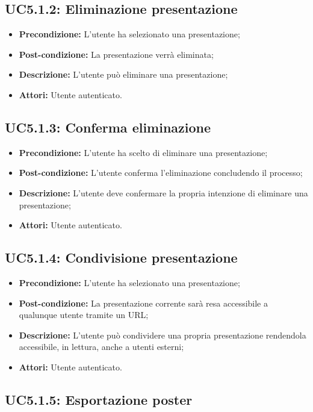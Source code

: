 \subsection{ UC5.1.2: Eliminazione presentazione}

\begin{itemize}
	\item \textbf{Precondizione:} L'utente ha selezionato una presentazione;
	\item \textbf{Post-condizione:} La presentazione verrà eliminata;
	\item \textbf{Descrizione:} L'utente può eliminare una presentazione;
	\item \textbf{Attori:} Utente autenticato.
\end{itemize}
\subsection{ UC5.1.3: Conferma eliminazione }

\begin{itemize}
	\item \textbf{Precondizione:} L'utente ha scelto di eliminare una presentazione;
	\item \textbf{Post-condizione:} L'utente conferma l'eliminazione concludendo il processo;
	\item \textbf{Descrizione:} L'utente deve confermare la propria intenzione di eliminare una presentazione;
	\item \textbf{Attori:} Utente autenticato.
\end{itemize}
\subsection{ UC5.1.4: Condivisione presentazione }

\begin{itemize}
	\item \textbf{Precondizione:} L'utente ha selezionato una presentazione;
	\item \textbf{Post-condizione:} La presentazione corrente sarà resa accessibile a qualunque utente tramite un URL;
	\item \textbf{Descrizione:} L'utente può condividere una propria presentazione rendendola accessibile, in lettura, anche a utenti esterni;
	\item \textbf{Attori:} Utente autenticato.
\end{itemize}
\subsection{ UC5.1.5: Esportazione poster}

